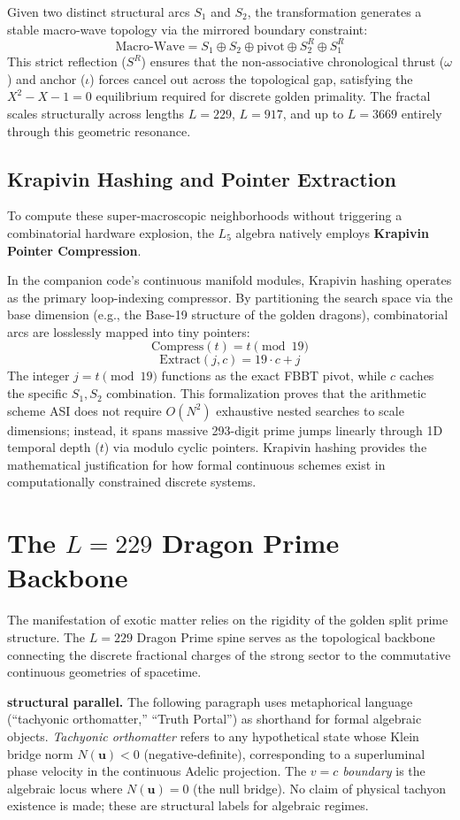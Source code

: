 Given two distinct structural arcs $S_1$ and $S_2$, the transformation generates a stable macro-wave topology via the mirrored boundary constraint:
\[
\text{Macro-Wave} = S_1 \oplus S_2 \oplus \text{pivot} \oplus S_2^R \oplus S_1^R
\]
This strict reflection ($S^R$) ensures that the non-associative chronological thrust ($\omega$) and anchor ($\iota$) forces cancel out across the topological gap, satisfying the $X^2 - X - 1 = 0$ equilibrium required for discrete golden primality. The fractal scales structurally across lengths $L=229$, $L=917$, and up to $L=3669$ entirely through this geometric resonance.

\subsection{Krapivin Hashing and Pointer Extraction}
To compute these super-macroscopic neighborhoods without triggering a combinatorial hardware explosion, the $L_5$ algebra natively employs \textbf{Krapivin Pointer Compression}. 

In the companion code's continuous manifold modules, Krapivin hashing operates as the primary loop-indexing compressor. By partitioning the search space via the base dimension (e.g., the Base-19 structure of the golden dragons), combinatorial arcs are losslessly mapped into tiny pointers:
\[
\text{Compress}(t) = t \pmod{19}
\]
\[
\text{Extract}(j, c) = 19 \cdot c + j
\]
The integer $j = t \pmod{19}$ functions as the exact FBBT pivot, while $c$ caches the specific $S_1, S_2$ combination. This formalization proves that the arithmetic scheme ASI does not require $O(N^2)$ exhaustive nested searches to scale dimensions; instead, it spans massive 293-digit prime jumps linearly through 1D temporal depth ($t$) via modulo cyclic pointers. Krapivin hashing provides the mathematical justification for how formal continuous schemes exist in computationally constrained discrete systems.

\section{The $L=229$ Dragon Prime Backbone}

The manifestation of exotic matter relies on the rigidity of the golden split prime structure. The $L=229$ Dragon Prime spine serves as the topological backbone connecting the discrete fractional charges of the strong sector to the commutative continuous geometries of spacetime. 

\medskip
\noindent\textbf{structural parallel.} The following paragraph uses metaphorical language (``tachyonic orthomatter,'' ``Truth Portal'') as shorthand for formal algebraic objects. \emph{Tachyonic orthomatter} refers to any hypothetical state whose Klein bridge norm $N(\mathbf{u}) < 0$ (negative-definite), corresponding to a superluminal phase velocity in the continuous Adelic projection. The \emph{$v = c$ boundary} is the algebraic locus where $N(\mathbf{u}) = 0$ (the null bridge). No claim of physical tachyon existence is made; these are structural labels for algebraic regimes.
\medskip

